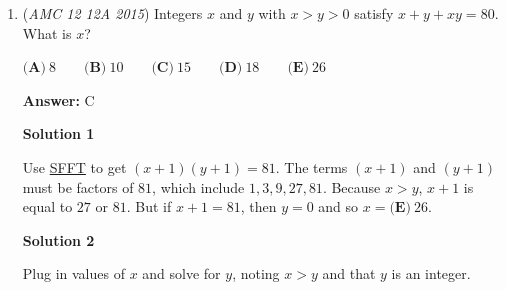 \begin{enumerate}
\textbf{Solution 2}

The order of the girls' drawing the balls really does not matter. Thus, we can let Cheryl draw first, so after she draws one ball, the other must be of the same color. Thus, the answer is $\frac{1}{5} \textbf{ (C)}$.

 



\textbf{Solution 3}

The total number of ways they can draw is ${6 \choose 2}$ ${4 \choose 2}$ ${2 \choose 2}$. Let Cheryl draw first and since there are three colors, there are ${3 \choose 1}$ ways she can get 2 marbles of the same color. The other two pick two each, which leads to ${4 \choose 2}$ and ${2 \choose 2}$, respectively.$\frac{{3 \choose 1}{4 \choose 2}{2 \choose 2}}{{6 \choose 2}{4 \choose 2}{2 \choose 2}} = \frac{1}{5} \textbf{ (C)}$




\textbf{Solution 4}

As others have said, Carol and Claudia should not have an impact on the 2 marbles Cheryl takes. This simplifies the problem into a total number of arrangements of Cheryl choosing 2 out of 6, and a total number of successful outcomes of 3 (two reds, two blues, and two yellows). This gives:$\frac{3}{{6 \choose 2}} = \frac{1}{5} = \textbf{ (C)}$.

 


	\item (\textit{AMC 12 12A 2015}) Integers $x$ and $y$ with $x>y>0$ satisfy $x+y+xy=80$. What is $x$?


 $\textbf{(A)}\ 8 \qquad\textbf{(B)}\ 10 \qquad\textbf{(C)}\ 15 \qquad\textbf{(D)}\ 18 \qquad\textbf{(E)}\ 26$

 \textbf{Answer: }C



\textbf{Solution 1}

Use \href{https://artofproblemsolving.com/wiki/index.php?title=SFFT}{SFFT} to get $(x+1)(y+1)=81$. The terms $(x+1)$ and $(y+1)$ must be factors of $81$, which include $1, 3, 9, 27, 81$. Because $x > y$, $x+1$ is equal to $27$ or $81$. But if $x+1=81$, then $y=0$ and so $x=\boxed{\textbf{(E)}\ 26}$.

 


 



\textbf{Solution 2}

Plug in values of $x$ and solve for $y$, noting $x > y$ and that $y$ is an integer. 


\end{enumerate}

